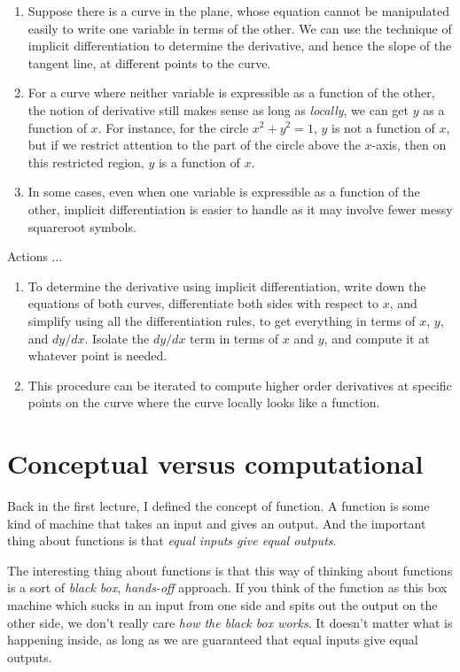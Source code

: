 \documentclass[10pt]{amsart}
\begin{document}
\begin{enumerate}
\item Suppose there is a curve in the plane, whose equation cannot be
  manipulated easily to write one variable in terms of the other. We
  can use the technique of implicit differentiation to determine the
  derivative, and hence the slope of the tangent line, at different
  points to the curve.
\item For a curve where neither variable is expressible as a function
  of the other, the notion of derivative still makes sense as long as
  {\em locally}, we can get $y$ as a function of $x$. For instance,
  for the circle $x^2 + y^2 = 1$, $y$ is not a function of $x$, but if
  we restrict attention to the part of the circle above the $x$-axis,
  then on this restricted region, $y$ is a function of $x$.
\item In some cases, even when one variable is expressible as a
  function of the other, implicit differentiation is easier to handle
  as it may involve fewer messy squareroot symbols.
\end{enumerate}

Actions ...

\begin{enumerate}
\item To determine the derivative using implicit differentiation,
  write down the equations of both curves, differentiate both sides
  with respect to $x$, and simplify using all the differentiation
  rules, to get everything in terms of $x$, $y$, and $dy/dx$. Isolate
  the $dy/dx$ term in terms of $x$ and $y$, and compute it at whatever
  point is needed.
\item This procedure can be iterated to compute higher order
  derivatives at specific points on the curve where the curve locally
  looks like a function.
\end{enumerate}

\section{Conceptual versus computational}

Back in the first lecture, I defined the concept of function. A
function is some kind of machine that takes an input and gives an
output. And the important thing about functions is that {\em equal
inputs give equal outputs}.

The interesting thing about functions is that this way of thinking
about functions is a sort of {\em black box}, {\em hands-off}
approach. If you think of the function as this box machine which sucks
in an input from one side and spits out the output on the other side,
we don't really care {\em how the black box works}. It doesn't matter
what is happening inside, as long as we are guaranteed that equal
inputs give equal outputs. 
\end{document}
